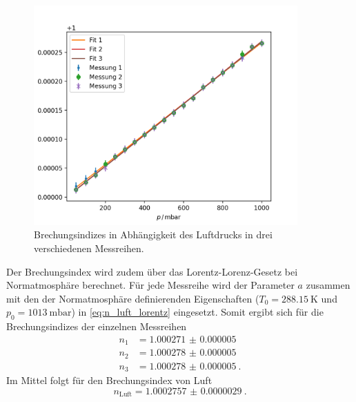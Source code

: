 \begin{figure}
    \centering
    \includegraphics[width=0.9\textwidth]{python/index.png}
    \caption{Brechungsindizes in Abhängigkeit des Luftdrucks in drei verschiedenen Messreihen.}
    \label{fig:luft}
\end{figure}
Der Brechungsindex wird zudem über das Lorentz-Lorenz-Gesetz bei Normatmosphäre berechnet.
Für jede Messreihe wird der Parameter $a$ zusammen mit den der Normatmosphäre definierenden Eigenschaften ($T_0 = \qty{288.15}{\kelvin}$ und $p_0 = \qty{1013}{\milli\bar}$) in \autoref{eq:n_luft_lorentz} eingesetzt.
Somit ergibt sich für die Brechungsindizes der einzelnen Messreihen
\begin{align*}
    n_1 &= \qty{1.000271(5)}{} \\
    n_2 &= \qty{1.000278(5)}{} \\
    n_3 &= \qty{1.000278(5)}{}.
\end{align*}
Im Mittel folgt für den Brechungsindex von Luft
\begin{equation*}
    n_\text{Luft} = \qty{1.0002757(29)}{}.
\end{equation*}
